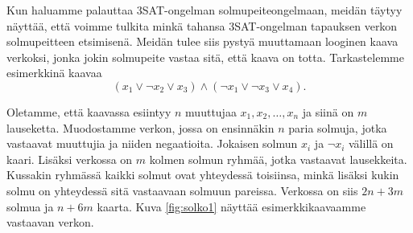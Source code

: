 Kun haluamme palauttaa 3SAT-ongelman solmupeiteongelmaan,
meidän täytyy näyttää, että voimme tulkita minkä tahansa
3SAT-ongelman tapauksen verkon solmupeitteen etsimisenä.
Meidän tulee siis pystyä muuttamaan looginen kaava verkoksi,
jonka jokin solmupeite vastaa sitä, että kaava on totta.
Tarkastelemme esimerkkinä kaavaa
\[(x_1 \lor \neg x_2 \lor x_3) \land (\neg x_1 \lor \neg x_3 \lor x_4).\]

Oletamme, että kaavassa esiintyy $n$ muuttujaa $x_1,x_2,\dots,x_n$
ja siinä on $m$ lauseketta.
Muodostamme verkon, jossa on ensinnäkin $n$ paria solmuja,
jotka vastaavat muuttujia ja niiden negaatioita.
Jokaisen solmun $x_i$ ja $\neg x_i$ välillä on kaari.
Lisäksi verkossa on $m$ kolmen solmun ryhmää,
jotka vastaavat lausekkeita.
Kussakin ryhmässä kaikki solmut ovat yhteydessä toisiinsa,
minkä lisäksi kukin solmu on yhteydessä sitä vastaavaan solmuun pareissa.
Verkossa on siis $2n+3m$ solmua ja $n+6m$ kaarta.
Kuva \ref{fig:solko1} näyttää esimerkkikaavaamme vastaavan verkon.

